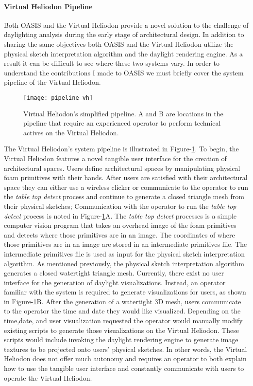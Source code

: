 \paragraph{Virtual Heliodon Pipeline}
Both OASIS and the Virtual Heliodon provide a novel solution to the challenge of daylighting analysis during the early stage of architectural design.  In addition to sharing the same objectives both OASIS and the Virtual Heliodon utilize the physical sketch interpretation algorithm and the daylight rendering engine.  As a result it can be difficult to see where these two systems vary.
In order to understand the contributions I made to OASIS we must briefly cover the system pipeline of the Virtual Heliodon.\\

\begin{figure}[!ht]
\centering
\texttt{[image: pipeline\_vh]}
\caption[The Virtual Heliodon's simplified pipeline.]{Virtual Heliodon's simplified pipeline. A and B are locations in the pipeline that require an experienced operator to perform technical actives on the Virtual Heliodon. }
\label{fig:pipeline_vh}
\end{figure}
The Virtual Heliodon's system pipeline is illustrated in Figure-\ref{fig:pipeline_vh}.  To begin, the Virtual Heliodon features a novel tangible user interface for the creation of architectural spaces.  Users define architectural spaces by manipulating physical foam primitives with their hands.  After users are satisfied with their architectural space they can either use a wireless clicker or communicate to the operator to run the \textit{table top detect} process and continue to generate a closed triangle mesh from their physical sketches; Communication with the operator to run the \textit{table top detect} process is noted in Figure-\ref{fig:pipeline_vh}A.  The \textit{table top detect} processes is a simple computer vision program that takes an overhead image of the foam primitives and detects where those primitives are in an image.  The coordinates of where those primitives are in an image are stored in an intermediate primitives file. The intermediate primitives file is used as input for the physical sketch interpretation algorithm. As mentioned previously, the physical sketch interpretation algorithm generates a closed watertight triangle mesh.  Currently, there exist no user interface for the generation of daylight visualizations.  Instead, an operator familiar with the system is required to generate visualizations for users, as shown in Figure-\ref{fig:pipeline_vh}B.  After the generation of  a watertight 3D mesh, users communicate to the operator the time and date they would like visualized.  Depending on the time,date, and user visualization requested the operator would manually modify existing scripts to generate those visualizations on the Virtual Heliodon.  These scripts would include invoking the daylight rendering engine to generate image textures to be projected onto users' physical sketches.  In other words, the Virtual Heliodon does not offer much autonomy and requires an operator to both explain how to use the tangible user interface and constantly communicate with users to operate the Virtual Heliodon.  \\
